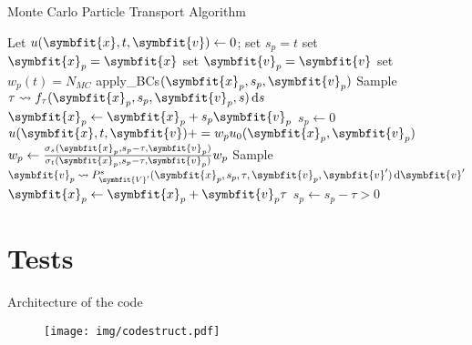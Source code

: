 \documentclass[aspectratio=1610]{beamer}
\newcommand{\bm}[1]{\symbfit{#1}}
\newcommand{\di}{\ensuremath{\, \mathrm{d}}}
\begin{document}
\begin{frame}[fragile]{Monte Carlo Particle Transport Algorithm}
	\setlength{\columnsep}{-1.5cm}
    \begin{multicols}{2}
    	\algrenewcommand\algorithmicindent{0.3em}%
        \begin{algorithmic}[1]
                \State Let $u(\bm{x}, t, \bm{v}) \gets 0$;
                    \State set $s_p = t$
                    \State set $\bm{x}_p = \bm{x}$
                    \State set $\bm{v}_p = \bm{v}$
                    \State set $w_p(t) = N_{MC}$
                        \If{$\bm{x}_p \not \in \mathcal{D}$}
                            \State apply\_BCs$(\bm{x}_p, s_p, \bm{v}_p)$
                        \EndIf
                        \State Sample $\tau \leadsto f_\tau(\bm{x}_p, s_p, \bm{v}_p, s) \di s$
                        \newcolumn
                            \State $\bm{x}_p \gets \bm{x}_p + s_p \bm{v}_p$
                            \State $s_p \gets 0$
                            \State $u(\bm{x}, t, \bm{v}) += w_p u_0(\bm{x}_p, \bm{v}_p)$
                        \Else
                            \State $w_p \gets \frac{\sigma_s(\bm{x}_p, s_p - \tau, \bm{v}_p)}{\sigma_t(\bm{x}_p, s_p - \tau, \bm{v}_p)} w_p$
                            \State Sample $\bm{v}_p \leadsto P_{\bm{V}'}^s(\bm{x}_p, s_p, \tau, \bm{v}_p, \bm{v}') \di \bm{v}'$
                            \State $\bm{x}_p \gets \bm{x}_p + \bm{v}_p \tau$
                            \State $s_p \gets s_p - \tau > 0$
                        \EndIf
                    \EndWhile
                \EndFor
        \end{algorithmic}
    \end{multicols}
\end{frame}

\section{Tests}

\begin{frame}{Architecture of the code}
	\begin{figure}
		\centering
		\texttt{[image: img/codestruct.pdf]}
		\label{fig:code_structure}
	\end{figure}
\end{frame}
\end{document}
